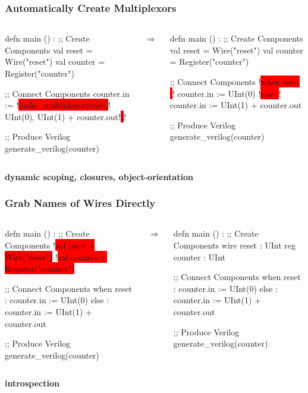 \documentclass[xcolor=pdflatex,dvipsnames,table]{beamer}
\begin{document}
\begin{frame}[fragile]
\frametitle{Automatically Create Multiplexors}
\begin{columns}
{
\begin{stanza}
defn main () :
  ;; Create Components
  val reset   = Wire("reset")
  val counter = Register("counter")

  ;; Connect Components
  counter.in :=
    !\colorbox{red}{make\_multiplexor(reset,}!
      UInt(0),
      UInt(1) + counter.out!\colorbox{red}{)}!

  ;; Produce Verilog
  generate_verilog(counter)
\end{stanza}
}
\begin{center}
$\Rightarrow$
\end{center}
{
\begin{stanza}
defn main () :
  ;; Create Components
  val reset   = Wire("reset")
  val counter = Register("counter")

  ;; Connect Components
  !\colorbox{red}{when reset :}!
    counter.in := UInt(0)
  !\colorbox{red}{else :}!
    counter.in := UInt(1) + counter.out

  ;; Produce Verilog
  generate_verilog(counter)
\end{stanza}
}
\end{columns}
\vspace{1cm}
{\bf dynamic scoping, closures, object-orientation}
\end{frame}

\begin{frame}[fragile]
\frametitle{Grab Names of Wires Directly}
\begin{columns}
{
\begin{stanza}
defn main () :
  ;; Create Components
  !\colorbox{red}{val reset   = Wire("reset")}
  !\colorbox{red}{val counter = Register("counter")}

  ;; Connect Components
  when reset :
    counter.in := UInt(0)
  else :
    counter.in := UInt(1) + counter.out

  ;; Produce Verilog
  generate_verilog(counter)
\end{stanza}
}
\begin{center}
$\Rightarrow$
\end{center}
{
\begin{stanza}
defn main () :
  ;; Create Components
  wire reset  : UInt
  reg counter : UInt

  ;; Connect Components
  when reset :
    counter.in := UInt(0)
  else :
    counter.in := UInt(1) + counter.out

  ;; Produce Verilog
  generate_verilog(counter)
\end{stanza}
}
\end{columns}
\vspace{1cm}
{\bf introspection}
\end{frame}
\end{document}
